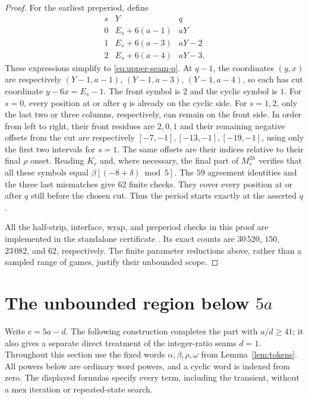 \documentclass[11pt]{article}
\theoremstyle{remark}\newtheorem{remark}[theorem]{Remark}
\begin{document}
\begin{proof}
For the earliest preperiod, define
\[
 \begin{array}{c|c|c}
 s&Y&q\\\hline
 0&E_s+6(a-1)&aY\\
 1&E_s+6(a-3)&aY-2\\
 2&E_s+6(a-4)&aY-3.
 \end{array}
\]
These expressions simplify to \eqref{eq:upper-seam-q}.
At $q-1$, the coordinates $(y,x)$ are respectively
$(Y-1,a-1)$, $(Y-1,a-3)$, $(Y-1,a-4)$, so each has cut coordinate
$y-6x=E_s-1$.  The front symbol is $2$ and the cyclic symbol is $1$.
For $s=0$, every position at or after $q$ is already on the cyclic
side.  For $s=1,2$, only the last two or three columns, respectively,
can remain on the front side.  In order from left to right, their
front residues are $2,0,1$ and their remaining negative offsets
from the cut are respectively $[-7,-1],[-13,-1],[-19,-1]$, using
only the first two intervals for $s=1$.  The same offsets are their
indices relative to their final $\rho$ onset.  Reading $K_r$ and,
where necessary, the final part of $M_r^{2h}$ verifies that all these
symbols equal $\beta[(-8+\delta)\bmod5]$.  The $59$ agreement
identities and the three last mismatches give $62$ finite checks.
They cover every position at or after $q$ still before the chosen
cut.  Thus the period starts exactly at the asserted $q$.

All the half-strip, interface, wrap, and preperiod checks in this
proof are implemented in the standalone certificate
.  Its exact counts are
$30\,520$, $150$, $23\,082$, and $62$, respectively.  The finite
parameter reductions above, rather than a sampled range of games,
justify their unbounded scope.
\end{proof}


\section{The unbounded region below \texorpdfstring{$5a$}{5a}}
\label{sec:lower-unbounded}\label{sec:lower-uniform}

Write $c=5a-d$. The following construction completes the part with
$a/d\ge41$; it also gives a separate direct treatment of the integer-ratio
seams $d=1$. Throughout this section use the fixed words
$\alpha,\beta,\rho,\omega$ from Lemma~\ref{lem:tokens}.
All powers below are ordinary word powers, and a cyclic word is indexed
from zero. The displayed formulas specify every term, including the
transient, without a mex iteration or repeated-state search.
\end{document}
